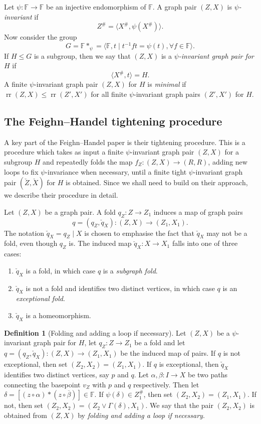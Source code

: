 \documentclass[11pt, a4paper]{amsart}
\theoremstyle{definition}
\newtheorem{definition}[theorem]{Definition}
\newcommand{\F}{\mathbb{F}}
\DeclareMathOperator{\rr}{rr}
\newcounter{cases}
\begin{document}
Let $\psi\colon \F\to \F$ be an injective endomorphism of $\F$. A graph pair $(Z, X)$ is \emph{$\psi$-invariant} if
\[
Z^{\#} = \langle X^{\#}, \psi(X^{\#})\rangle.
\]
Now consider the group
\[
G = \F*_{\psi} = \langle \F, t \mid t^{-1}ft = \psi(t), \forall f\in \F\rangle.
\]
If $H\leqslant G$ is a subgroup, then we say that $(Z, X)$ is a \emph{$\psi$-invariant graph pair for $H$} if
\[
\langle X^{\#}, t \rangle = H.
\]
A finite $\psi$-invariant graph pair $(Z, X)$ for $H$ is \emph{minimal} if $\rr(Z, X)\leqslant \rr(Z', X')$ for all finite $\psi$-invariant graph pairs $(Z', X')$ for $H$.


\subsection{The Feighn--Handel tightening procedure}

A key part of the Feighn--Handel paper \cite{FH99} is their tightening procedure. This is a procedure which takes as input a finite $\psi$-invariant graph pair $(Z, X)$ for a subgroup $H$ and repeatedly folds the map $f_Z\colon(Z, X)\to (R, R)$, adding new loops to fix $\psi$-invariance when necessary, until a finite tight $\psi$-invariant graph pair $(\check{Z}, \check{X})$ for $H$ is obtained. Since we shall need to build on their approach, we describe their procedure in detail.

Let $(Z, X)$ be a graph pair. A fold $q_Z\colon Z\to Z_1$ induces a map of graph pairs 
\[
q = (q_Z, \check{q}_X)\colon (Z, X)\to (Z_1, X_1).
\]
The notation $\check{q}_X = q_Z\mid X$ is chosen to emphasise the fact that $\check{q}_X$ may not be a fold, even though $q_Z$ is. The induced map $\check{q}_X\colon X\to X_1$ falls into one of three cases:
\begin{enumerate}
\item $\check{q}_X$ is a fold, in which case $q$ is a \emph{subgraph fold}.
\item $\check{q}_X$ is not a fold and identifies two distinct vertices, in which case $q$ is an \emph{exceptional fold}.
\item $\check{q}_X$ is a homeomorphism.
\end{enumerate}

\begin{definition}[Folding and adding a loop if necessary]
Let $(Z, X)$ be a $\psi$-invariant graph pair for $H$, let $q_Z\colon Z\to Z_1$ be a fold and let $q = (q_Z, \check{q}_X)\colon (Z, X)\to (Z_1, X_1)$ be the induced map of pairs. If $q$ is not exceptional, then set $(Z_2, X_2) = (Z_1, X_1)$. If $q$ is exceptional, then $\check{q}_X$ identifies two distinct vertices, say $p$ and $q$. Let $\alpha, \beta\colon I\to X$ be two paths connecting the basepoint $v_Z$ with $p$ and $q$ respectively. Then let $\delta=[(z\circ\alpha)*(z\circ\overline{\beta})]\in \F$. If $\psi(\delta)\in Z_1^{\#}$, then set $(Z_2, X_2) = (Z_1, X_1)$. If not, then set $(Z_2, X_2) = (Z_2\vee\Gamma(\delta), X_1)$. We say that the pair $(Z_2, X_2)$ is obtained from $(Z, X)$ by \emph{folding and adding a loop if necessary}.
\end{definition}
\end{document}
